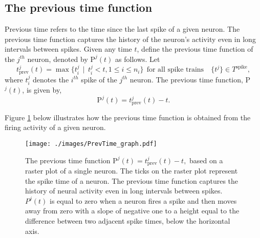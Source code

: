 
\subsection{The previous time function}
Previous time refers to the time since the last spike of a given neuron. The previous time function captures the history of the neuron's  activity even in long intervals between spikes.
Given any time $t$, define the previous time function of the $j^{th}$ neuron, denoted by $\text{P}^{j}(t)$ as follows. Let 
\[
t^{j}_{\text{prev}}(t) = \displaystyle \max  \{  t^{j}_{i} \ \ | \ \ t^{j}_{i} < t, 1 \leq i \leq n_{i} \} \ \ \text{for all spike trains} \quad  \{t^{j}\} \in T^{\text{spike}}, 
\]
where $t^j_i$ denotes the $i^{th}$ spike of the $j^{th}$ neuron.  The previous time function, P$^{j}(t)$, is given by, 
\begin{equation}\label{prevtimefun}
\text{P}^{j}(t) = t^{j}_{\text{prev}}(t) - t.
\end{equation}


Figure \ref{fig:PrevTime} below illustrates how the previous time function is obtained from the firing activity of a given neuron.


 \begin{figure}[H]
        \centering
          \texttt{[image: ./images/PrevTime\_graph.pdf]}
           \caption[]
            {\small  The previous time function $\text{P}^{j}(t) = t^{j}_{\text{prev}}(t) - t,$ based on a raster plot of a single neuron.   The ticks on the raster plot represent the spike time of a neuron.  The previous time function captures the history of neural activity even in long intervals between spikes.  $P^{j}(t)$ is equal to zero when a neuron fires a spike  and then moves away from zero with a slope of negative one to a height equal to the difference between two adjacent spike times, below the horizontal axis.  } 
             \label{fig:PrevTime}
  \end{figure}


